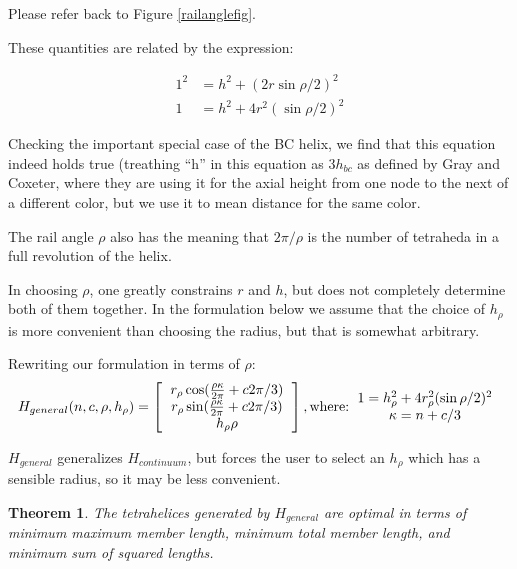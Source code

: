 \documentclass[11pt]{article}
\newtheorem{theorem}{Theorem}
\begin{document}
Please refer back to Figure \ref{railanglefig}.

 These quantities are related by the expression:

\begin{align*}
  1^2 &= h^2 + (2 r \sin{ \rho / 2})^2 \\
  1 &= h^2 + 4 r^2 (\sin{ \rho / 2})^2 
\end{align*}

Checking the important special case of the BC helix, we find that this equation
indeed holds true (treathing ``h'' in this equation as $3 h_{bc}$ as defined by
Gray and Coxeter, where they are using it for the axial height from one node to
the next of a different color, but we use it to mean distance for the same color.

The rail angle $\rho$ also has the meaning that $2 \pi / \rho$ is the number of
tetraheda in a full revolution of the helix.

In choosing $\rho$, one greatly constrains $r$ and $h$, but does not completely
determine both of them together. In the formulation below we assume that
the choice of $h_{\rho}$ is more convenient than choosing the radius,
but that is somewhat arbitrary.


Rewriting our formulation in terms of $\rho$:
\[
H_{general}(n,c,\rho,h_{\rho}) =
\left [
  \begin{tabular}{c}
   $ r_{\rho} \cos(\frac{\rho \kappa}{2\pi} + c 2 \pi /3) $\\
   $ r_{\rho}  \sin(\frac{\rho \kappa}{2\pi} + c 2 \pi /3) $\\
   $ h_{\rho} \rho $
  \end{tabular}
  \right ],
\text{where:}
\begin{tabular}{c}
  $   1 = h_{\rho}^2 + 4 r_{\rho}^2 (\sin{ \rho / 2})^2 $ \\
    $\kappa = n + c/3$ \\
  \end{tabular}      
\]

$H_{general}$ generalizes $H_{continuum}$, but forces the user to select an $h_{\rho}$
which has a sensible radius, so it may be less convenient.

\begin{theorem}
  \label{generalformulaoptimal}
  The tetrahelices generated by $H_{general}$ are optimal in terms of minimum maximum member length, minimum total member length, and minimum
  sum of squared lengths.
\end{theorem}
\end{document}
